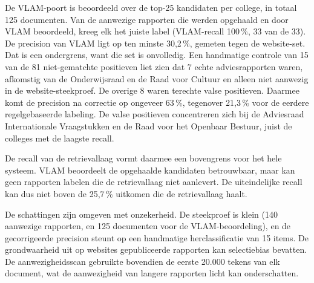 \noindent De VLAM-poort is beoordeeld over de top-25 kandidaten per college, in totaal
125 documenten. Van de aanwezige rapporten die werden opgehaald en door VLAM
beoordeeld, kreeg elk het juiste label (VLAM-recall 100\,\%, 33 van de 33). De
precision van VLAM ligt op ten minste 30,2\,\%, gemeten tegen de website-set. Dat is
een ondergrens, want die set is onvolledig. Een handmatige controle van 15 van de 81
niet-gematchte positieven liet zien dat 7 echte adviesrapporten waren, afkomstig van de
Onderwijsraad en de Raad voor Cultuur en alleen niet aanwezig in de website-steekproef.
De overige 8 waren terechte valse positieven. Daarmee komt de precision na correctie op
ongeveer 63\,\%, tegenover 21,3\,\% voor de eerdere regelgebaseerde labeling. De valse
positieven concentreren zich bij de Adviesraad Internationale Vraagstukken en de Raad
voor het Openbaar Bestuur, juist de colleges met de laagste recall.

\noindent De recall van de retrievallaag vormt daarmee een bovengrens voor het hele
systeem. VLAM beoordeelt de opgehaalde kandidaten betrouwbaar, maar kan geen rapporten
labelen die de retrievallaag niet aanlevert. De uiteindelijke recall kan dus niet boven
de 25,7\,\% uitkomen die de retrievallaag haalt.

\noindent De schattingen zijn omgeven met onzekerheid. De steekproef is klein
(140 aanwezige rapporten, en 125 documenten voor de VLAM-beoordeling), en de
gecorrigeerde precision steunt op een handmatige herclassificatie van 15 items. De
grondwaarheid uit op websites gepubliceerde rapporten kan selectiebias bevatten. De
aanwezigheidsscan gebruikte bovendien de eerste 20.000 tekens van elk document, wat de
aanwezigheid van langere rapporten licht kan onderschatten.

